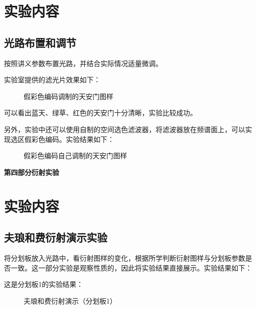 \documentclass[11pt]{article}
\newcommand{\chapter}[2]{\begin{center}\bf\Large{第#1部分\quad #2}\end{center}}
\begin{document}
\section{实验内容}

\subsection{光路布置和调节}

按照讲义参数布置光路，并结合实际情况适量微调。

实验室提供的滤光片效果如下：

\begin{figure}[H]
    \centering
    \caption{假彩色编码调制的天安门图样}
\end{figure}

可以看出蓝天、绿草、红色的天安门十分清晰，实验比较成功。

另外，实验中还可以使用自制的空间选色滤波器，将滤波器放在频谱面上，可以实现选区假彩色编码。实验结果如下：

\begin{figure}[H]
    \centering
    \caption{假彩色编码自己调制的天安门图样}
\end{figure}

\setcounter{section}{0}

\chapter{四}{衍射实验}

\section{实验内容}

\subsection{夫琅和费衍射演示实验}

将分划板放入光路中，看衍射图样的变化，根据所学判断衍射图样与分划板参数是否一致。这一部分实验是观察性质的，因此将实验结果直接展示。实验结果如下：

这是分划板1的实验结果：

\begin{figure}[H]
    \centering
    \caption{夫琅和费衍射演示（分划板1）}
\end{figure}
\end{document}
